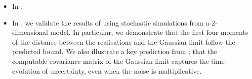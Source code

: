 \begin{itemize}
	\item In ,

	\item In , we validate the results of  using stochastic simulations from a 2-dimensional model.
	      In particular, we demonstrate that the first four moments of the distance between the realisations and the Gaussian limit follow the predicted bound.
	      We also illustrate a key prediction from ; that the computable covariance matrix of the Gaussian limit captures the time-evolution of uncertainty, even when the noise is multiplicative.

\end{itemize}
